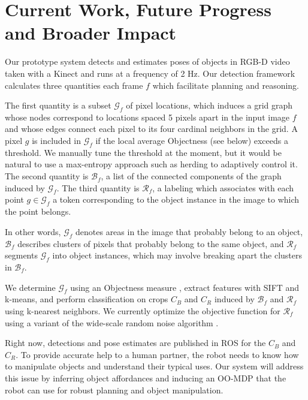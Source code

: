 \documentclass[12pt]{article}
\numberwithin{equation}{section}
\numberwithin{table}{section}
\numberwithin{figure}{section}
\begin{document}
\section{Current Work, Future Progress and Broader Impact}
Our prototype system detects and estimates poses of objects in RGB-D video taken with a Kinect and
runs at a frequency of 2 Hz. Our detection framework
calculates three quantities each frame $f$ which facilitate
planning and reasoning. 

The first quantity is a subset $\mathcal{G}_f$ of pixel locations, which induces a grid graph whose nodes
correspond to locations spaced 5 pixels apart in the input image $f$ and whose edges connect each pixel to its
four cardinal neighbors in the grid. A pixel $g$ is included in $\mathcal{G}_f$ if the local average Objectness (see below)
exceeds a threshold. We manually tune the threshold at the moment, but it would be natural to use a
max-entropy approach such as herding \cite{herding} to adaptively control it.
The second quantity is $\mathcal{B}_f$, a list of the connected components of the graph induced by $\mathcal{G}_f$.
The third quantity is $\mathcal{R}_f$, a labeling which associates with each point $g \in \mathcal{G}_f$ a token
corresponding to the object instance in the image to which the point belongs.

In other words, $\mathcal{G}_f$ denotes areas in the image that probably belong to an object, 
$\mathcal{B}_f$ describes clusters of pixels that probably belong to the same object, and $\mathcal{R}_f$
segments $\mathcal{G}_f$ into object instances, which may involve breaking apart the clusters in $\mathcal{B}_f$.

We determine $\mathcal{G}_f$ using an Objectness measure \cite{bing}, extract features with SIFT \cite{sift} 
and k-means, and perform classification on crops $C_B$ and $C_R$ induced by $\mathcal{B}_f$ and $\mathcal{R}_f$ using k-nearest neighbors. 
We currently optimize the objective function for $\mathcal{R}_f$ using a variant of the wide-scale random noise algorithm \cite{wsrn}.

Right now, detections and pose estimates are published in ROS for the $C_B$ and $C_R$. To provide accurate help
to a human partner, the robot needs to know how to manipulate objects and understand their typical uses.
Our system will address this issue by inferring object affordances and inducing an OO-MDP \cite{OOMDP} that the robot
can use for robust planning and object manipulation.
\end{document}
